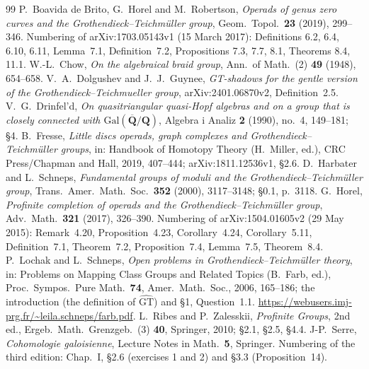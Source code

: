 \documentclass[11pt]{amsart}
\theoremstyle{definition}
\theoremstyle{remark}
\begin{document}
\begin{thebibliography}{99}
 P.~Boavida de Brito, G.~Horel and M.~Robertson, \emph{Operads of genus zero curves and the Grothendieck--Teichm\"uller group}, Geom.\ Topol.\ \textbf{23} (2019), 299--346. Numbering of arXiv:1703.05143v1 (15 March 2017): Definitions 6.2, 6.4, 6.10, 6.11, Lemma~7.1, Definition~7.2, Propositions 7.3, 7.7, 8.1, Theorems 8.4, 11.1.
 W.-L.~Chow, \emph{On the algebraical braid group}, Ann.\ of Math.\ (2) \textbf{49} (1948), 654--658.
 V.~A.~Dolgushev and J.~J.~Guynee, \emph{GT-shadows for the gentle version of the Grothendieck--Teichmueller group}, arXiv:2401.06870v2, Definition~2.5.
 V.~G.~Drinfel'd, \emph{On quasitriangular quasi-Hopf algebras and on a group that is closely connected with $\mathrm{Gal}(\overline{\mathbf Q}/\mathbf Q)$}, Algebra i Analiz \textbf{2} (1990), no.~4, 149--181; \S4.
 B.~Fresse, \emph{Little discs operads, graph complexes and Grothendieck--Teichm\"uller groups}, in: Handbook of Homotopy Theory (H.~Miller, ed.), CRC Press/Chapman and Hall, 2019, 407--444; arXiv:1811.12536v1, \S2.6.
 D.~Harbater and L.~Schneps, \emph{Fundamental groups of moduli and the Grothendieck--Teichm\"uller group}, Trans.\ Amer.\ Math.\ Soc.\ \textbf{352} (2000), 3117--3148; \S0.1, p.~3118.
 G.~Horel, \emph{Profinite completion of operads and the Grothendieck--Teichm\"uller group}, Adv.\ Math.\ \textbf{321} (2017), 326--390. Numbering of arXiv:1504.01605v2 (29 May 2015): Remark~4.20, Proposition~4.23, Corollary~4.24, Corollary~5.11, Definition~7.1, Theorem~7.2, Proposition~7.4, Lemma~7.5, Theorem~8.4.
 P.~Lochak and L.~Schneps, \emph{Open problems in Grothendieck--Teichm\"uller theory}, in: Problems on Mapping Class Groups and Related Topics (B.~Farb, ed.), Proc.\ Sympos.\ Pure Math.\ \textbf{74}, Amer.\ Math.\ Soc., 2006, 165--186; the introduction (the definition of $\widehat{\mathrm{GT}}$) and \S1, Question~1.1. \url{https://webusers.imj-prg.fr/~leila.schneps/farb.pdf}.
 L.~Ribes and P.~Zalesskii, \emph{Profinite Groups}, 2nd ed., Ergeb.\ Math.\ Grenzgeb.\ (3) \textbf{40}, Springer, 2010; \S2.1, \S2.5, \S4.4.
 J-P.~Serre, \emph{Cohomologie galoisienne}, Lecture Notes in Math.\ \textbf{5}, Springer. Numbering of the third edition: Chap.~I, \S2.6 (exercises 1 and 2) and \S3.3 (Proposition~14).
\end{thebibliography}
\end{document}
